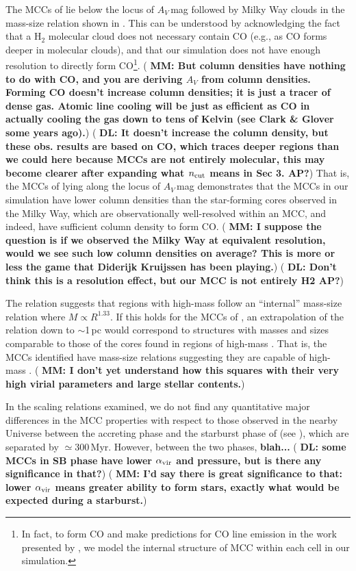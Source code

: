 \IfFileExists{emulateapjlegacy.cls}{\documentclass[iop]{emulateapjlegacy}}{\documentclass[iop]{emulateapj}}
\newcommand{\DL}[1]{({\bf \color{dlcolor} DL: #1})}
\newcommand{\MM}[1]{({\bf \color{mmcolor} MM: #1})}
\begin{document}
The MCCs of \flower lie below the locus of $A_V$\,mag followed
by Milky Way clouds in the mass-size relation shown in . This
can be understood by acknowledging the fact that a H$_2$ molecular
cloud does not necessary contain CO (e.g., as CO forms deeper in
molecular clouds), and that our simulation does not have enough
resolution to directly form CO\footnote{In fact, to form CO and make
  predictions for CO line emission in the work presented by
  \citet{Vallini18a}, we model the internal structure of MCC within
  each cell in our simulation.}.  
\MM{But column densities have nothing to do with CO, and you are
  deriving $A_V$ from column densities.  Forming CO doesn't increase
  column densities; it is just a tracer of dense gas.  Atomic line
  cooling will be just as efficient as CO in actually cooling the gas
  down to tens of Kelvin (see Clark \& Glover some years ago).}
\DL{It doesn't increase the column density, but these obs. results are based on CO, which traces deeper 
regions than we could here because MCCs are not entirely molecular, this may become clearer after 
expanding what $n_{\rm cut}$ means in Sec 3. {\bf AP?}}
%
That is, the MCCs of \flower lying along the locus of $A_V$\,mag 
    demonstrates
that the MCCs in our simulation have lower column densities than the
star-forming cores observed in the Milky Way, which are
observationally well-resolved within an MCC, and indeed, have
sufficient column density to form CO.  \MM{I suppose the question is
  if we observed the Milky Way at equivalent resolution, would we see
  such low column densities on average?  This is more or less the game
that Diderijk Kruijssen has been playing.}
\DL{Don't think this is a resolution effect, but our MCC is not entirely H2 {\bf AP?}}

The \citet{Kauffmann10c} relation suggests that regions with high-mass \SF follow 
an ``internal'' mass-size relation where $M\propto R^{1.33}$.
If this holds for the MCCs of \flower, an extrapolation of the \citet{Kauffmann10c} relation down to $\sim$1\,pc would correspond to structures with masses and sizes comparable to those of the cores found in
regions of high-mass \SF. That is, the MCCs identified have mass-size
relations suggesting they are capable of high-mass \SF. \MM{I don't
  yet understand how this squares with their very high virial
  parameters and large stellar contents.}

In the scaling relations examined, we do not find any quantitative major differences
in the MCC properties with respect to those observed in the nearby Universe 
between the accreting phase and the starburst phase of \flower (see
), which are separated by $\simeq$300\,Myr. 
However, between the two phases, {\bf blah...}
\DL{some MCCs in SB phase have
lower $\alpha_{\rm vir}$ and pressure, but 
is there any significance in that?} \MM{I'd say there is great
significance to that: lower $\alpha_{\rm vir}$ means greater ability to form
stars, exactly what would be expected during a starburst.}
\end{document}
